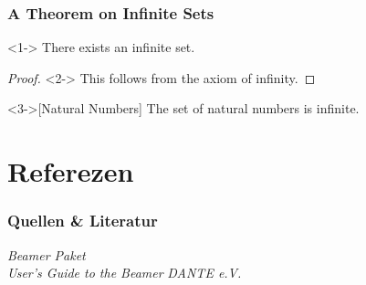 \documentclass[aspectratio=1610, compress, bigger]{beamer}
\begin{document}
\begin{frame}
   \frametitle{A Theorem on Infinite Sets}
   \begin{theorem}<1->
     There exists an infinite set.
   \end{theorem}
   \begin{proof}<2->
     This follows from the axiom of infinity.
\end{proof}
   \begin{example}<3->[Natural Numbers]
     The set of natural numbers is infinite.
   \end{example}
 \end{frame}

\appendix

\section[Quellen]{Referezen}
\begin{frame}\frametitle{Quellen \& Literatur}

\begin{thebibliography}{Beamerdokumentation}
 \emph{Beamer Paket} \\ 
 \emph{User's Guide to the Beamer} 
 \emph{DANTE e.V.}    
\end{thebibliography}


\end{frame}
\end{document}
